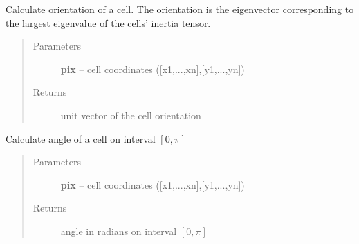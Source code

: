 \documentclass[letterpaper,10pt,english]{sphinxmanual}
\begin{document}
\begin{fulllineitems}
\label{AnalysisUtils:AnalysisUtils.getCellOrientation}
Calculate orientation of a cell. The orientation is the eigenvector corresponding to the largest eigenvalue of the cells' inertia tensor.
\begin{quote}\begin{description}
\item[{Parameters}] \leavevmode
\textbf{pix} -- cell coordinates ({[}x1,...,xn{]},{[}y1,...,yn{]})

\item[{Returns}] \leavevmode
unit vector of the cell orientation

\end{description}\end{quote}




{\hyperref[AnalysisUtils:AnalysisUtils.getCellInertiaTensor]{}}



\end{fulllineitems}


\begin{fulllineitems}
\label{AnalysisUtils:AnalysisUtils.getCellAngle}
Calculate angle of a cell on interval $[0,\pi]$
\begin{quote}\begin{description}
\item[{Parameters}] \leavevmode
\textbf{pix} -- cell coordinates ({[}x1,...,xn{]},{[}y1,...,yn{]})

\item[{Returns}] \leavevmode
angle in radians on interval $[0,\pi]$

\end{description}\end{quote}




{\hyperref[AnalysisUtils:AnalysisUtils.getCellOrientation]{}}



\end{fulllineitems}

\end{document}
